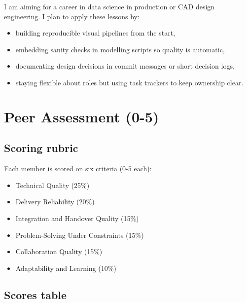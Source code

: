 \noindent I am aiming for a career in data science in production or CAD design engineering. I plan to apply these lessons by:

\begin{itemize}[leftmargin=1.5em]
\item building reproducible visual pipelines from the start,
\item embedding sanity checks in modelling scripts so quality is automatic,
\item documenting design decisions in commit messages or short decision logs,
\item staying flexible about roles but using task trackers to keep ownership clear.
\end{itemize}

\chapter{Peer Assessment (0-5)}


\section{Scoring rubric}


\noindent Each member is scored on six criteria (0-5 each):

\begin{itemize}[leftmargin=1.5em]
\item Technical Quality (25\%)
\item Delivery Reliability (20\%)
\item Integration and Handover Quality (15\%)
\item Problem-Solving Under Constraints (15\%)
\item Collaboration Quality (15\%)
\item Adaptability and Learning (10\%)
\end{itemize}

\section{Scores table}


\begin{table}[H]
\centering
\small
\setlength{\tabcolsep}{4pt}
\renewcommand{\arraystretch}{1.1}
\end{table}


